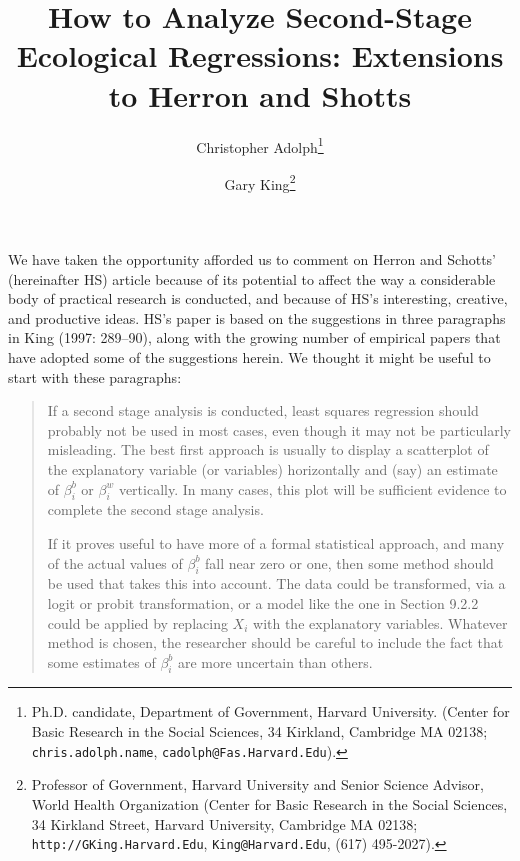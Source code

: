 \documentclass[11pt,titlepage]{article}
\title{How to Analyze Second-Stage Ecological Regressions: Extensions
  to Herron and Shotts}
\author{Christopher Adolph\thanks{Ph.D. candidate, Department of
    Government, Harvard University. (Center for Basic Research in the
    Social Sciences, 34 Kirkland, Cambridge MA 02138;
    \texttt{chris.adolph.name}, \texttt{cadolph@Fas.Harvard.Edu}).}
\and %
Gary King\thanks{Professor of Government, Harvard University and
  Senior Science Advisor, World Health Organization (Center for Basic
  Research in the Social Sciences, 34 Kirkland Street, Harvard
  University, Cambridge MA 02138; \texttt{http://GKing.Harvard.Edu},
  \texttt{King@Harvard.Edu}, (617) 495-2027).}  }
\begin{document}
\maketitle
\begin{abstract}
  
\end{abstract}
We have taken the opportunity afforded us to comment on Herron and
Schotts' (hereinafter HS) article because of its potential to affect
the way a considerable body of practical research is conducted, and
because of HS's interesting, creative, and productive ideas.  HS's
paper is based on the suggestions in three paragraphs in King (1997:
289--90), along with the growing number of empirical papers that have
adopted some of the suggestions herein.  We thought it might be useful
to start with these paragraphs:
\begin{quotation}
  If a second stage analysis is conducted, least squares regression
  should probably not be used in most cases, even though it may not be
  particularly misleading.  The best first approach is usually to
  display a scatterplot of the explanatory variable (or variables)
  horizontally and (say) an estimate of $\beta_i^b$ or $\beta_i^w$
  vertically.  In many cases, this plot will be sufficient evidence to
  complete the second stage analysis.
  
  If it proves useful to have more of a formal statistical approach,
  and many of the actual values of $\beta_i^b$ fall near zero or one,
  then some method should be used that takes this into account.  The
  data could be transformed, via a logit or probit transformation, or
  a model like the one in Section 9.2.2 could be applied by replacing
  $X_i$ with the explanatory variables.  Whatever method is chosen,
  the researcher should be careful to include the fact that some
  estimates of $\beta_i^b$ are more uncertain than others.
    

\end{quotation}
\end{document}
